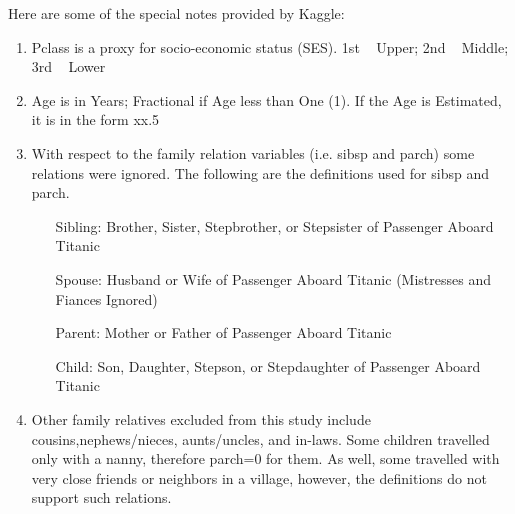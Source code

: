 Here are some of the special notes provided by Kaggle:
\begin{enumerate}
\item Pclass is a proxy for socio-economic status (SES). 1st ~ Upper; 2nd ~ Middle; 3rd ~ Lower

\item Age is in Years; Fractional if Age less than One (1). If the Age is Estimated, it is in the form xx.5

\item With respect to the family relation variables (i.e. sibsp and parch) some relations were ignored.  The following are the definitions used for sibsp and parch.
\begin{enumerate}

\item[Sibling:]  Brother, Sister, Stepbrother, or Stepsister of Passenger Aboard Titanic
\item[Spouse:]   Husband or Wife of Passenger Aboard Titanic (Mistresses and Fiances Ignored)
\item[Parent:]   Mother or Father of Passenger Aboard Titanic
\item[Child:]    Son, Daughter, Stepson, or Stepdaughter of Passenger Aboard Titanic

\end{enumerate}
\item Other family relatives excluded from this study include cousins,nephews/nieces, aunts/uncles, and in-laws.  Some children travelled only with a nanny, therefore parch=0 for them.  As well, some travelled with very close friends or neighbors in a village, however, the definitions do not support such relations.

\end{enumerate}

